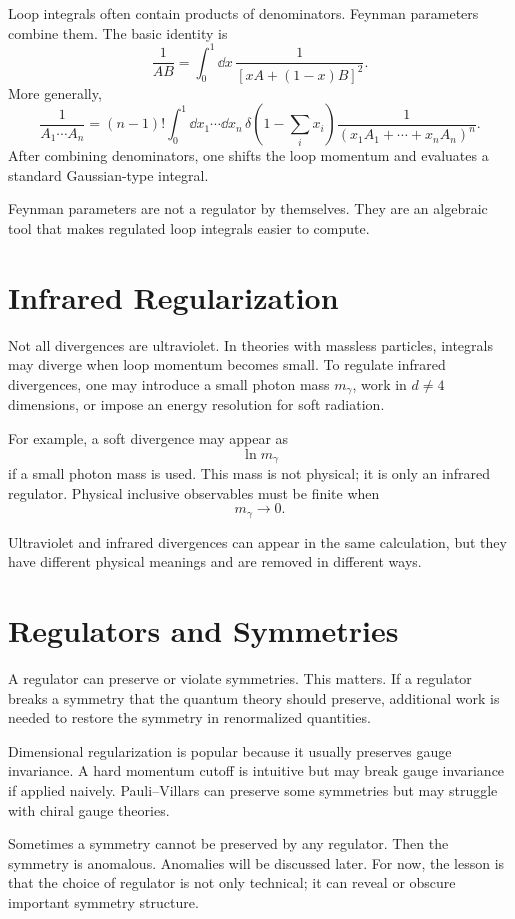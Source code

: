 Loop integrals often contain products of denominators. Feynman parameters combine
them. The basic identity is
\[
    \frac{1}{AB}
    = \int_0^1\dd x\,\frac{1}{[xA+(1-x)B]^2}.
\]
More generally,
\[
    \frac{1}{A_1\cdots A_n}
    = (n-1)!\int_0^1\dd x_1\cdots\dd x_n\,
      \delta\left(1-\sum_i x_i\right)
      \frac{1}{(x_1A_1+\cdots+x_nA_n)^n}.
\]
After combining denominators, one shifts the loop momentum and evaluates a
standard Gaussian-type integral.

Feynman parameters are not a regulator by themselves. They are an algebraic tool
that makes regulated loop integrals easier to compute.

\section{Infrared Regularization}

Not all divergences are ultraviolet. In theories with massless particles,
integrals may diverge when loop momentum becomes small. To regulate infrared
divergences, one may introduce a small photon mass \(m_\gamma\), work in
\(d\neq4\) dimensions, or impose an energy resolution for soft radiation.

For example, a soft divergence may appear as
\[
    \ln m_\gamma
\]
if a small photon mass is used. This mass is not physical; it is only an infrared
regulator. Physical inclusive observables must be finite when
\[
    m_\gamma\to0.
\]

Ultraviolet and infrared divergences can appear in the same calculation, but
they have different physical meanings and are removed in different ways.

\section{Regulators and Symmetries}

A regulator can preserve or violate symmetries. This matters. If a regulator
breaks a symmetry that the quantum theory should preserve, additional work is
needed to restore the symmetry in renormalized quantities.

Dimensional regularization is popular because it usually preserves gauge
invariance. A hard momentum cutoff is intuitive but may break gauge invariance if
applied naively. Pauli--Villars can preserve some symmetries but may struggle
with chiral gauge theories.

Sometimes a symmetry cannot be preserved by any regulator. Then the symmetry is
anomalous. Anomalies will be discussed later. For now, the lesson is that the
choice of regulator is not only technical; it can reveal or obscure important
symmetry structure.

